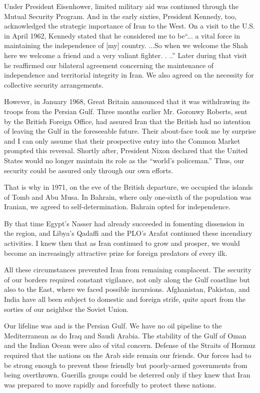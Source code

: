 Under President Eisenhower, limited military aid was continued through the Mutual Security Program. And in the early sixties, President Kennedy, too, acknowledged the strategic importance of Iran to the West. On a visit to the U.S. in April 1962, Kennedy stated that he considered me to be“... a vital force in maintaining the independence of [my] country. ...So when we welcome the Shah here we welcome a friend and a very valiant fighter. . ..” Later during that visit he reaffirmed our bilateral agreement concerning the maintenance of independence and territorial integrity in Iran. We also agreed on the necessity for collective security arrangements. 

However, in January 1968, Great Britain announced that it was withdrawing its troops from the Persian Gulf. Three months earlier Mr. Goronwy Roberts, sent by the British Foreign Office, had assured Iran that the British had no intention of leaving the Gulf in the foreseeable future. Their about-face took me by surprise and I can only assume that their prospective entry into the Common Market prompted this reversal. Shortly after, President Nixon declared that the United States would no longer maintain its role as the “world's policeman.” Thus, our security could be assured only through our own efforts. 

That is why in 1971, on the eve of the British departure, we occupied the islands of Tomb and Abu Musa. In Bahrain, where only one-sixth of the population was Iranian, we agreed to self-determination. Bahrain opted for independence. 

By that time Egypt’s Nasser had already succeeded in fomenting dissension in the region, and Libya’s Qadaffi and the PLO’s Arafat continued these incendiary activities. I knew then that as Iran continued to grow and prosper, we would become an increasingly attractive prize for foreign predators of every ilk. 


All these circumstances prevented Iran from remaining complacent. The security of our borders required constant vigilance, not only along the Gulf coastline but also to the East, where we faced possible incursions. Afghanistan, Pakistan, and India have all been subject to domestic and foreign strife, quite apart from the sorties of our neighbor the Soviet Union. 

Our lifeline was and is the Persian Gulf. We have no oil pipeline to the Mediterranean as do Iraq and Saudi Arabia. The stability of the Gulf of Oman and the Indian Ocean were also of vital concern. Defense of the Straits of Hormuz required that the nations on the Arab side remain our friends. Our forces had to be strong enough to prevent these friendly but poorly-armed governments from being overthrown. Guerilla groups could be deterred only if they knew that Iran was prepared to move rapidly and forcefully to protect these nations. 

